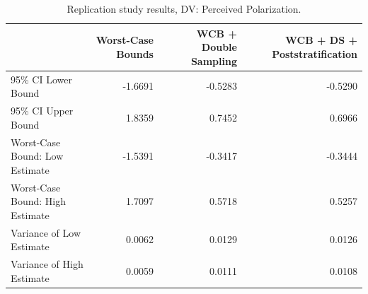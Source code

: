 \begin{table}

\caption{Replication study results, DV: Perceived Polarization.}
\centering
\begin{tabular}[t]{lrrr}
\toprule
 & Worst-Case Bounds & WCB + Double Sampling & WCB + DS + Poststratification\\
\midrule
95\% CI Lower Bound & -1.6691 & -0.5283 & -0.5290\\
95\% CI Upper Bound & 1.8359 & 0.7452 & 0.6966\\
Worst-Case Bound: Low Estimate & -1.5391 & -0.3417 & -0.3444\\
Worst-Case Bound: High Estimate & 1.7097 & 0.5718 & 0.5257\\
Variance of Low Estimate & 0.0062 & 0.0129 & 0.0126\\
\addlinespace
Variance of High Estimate & 0.0059 & 0.0111 & 0.0108\\
\bottomrule
\end{tabular}
\end{table}

